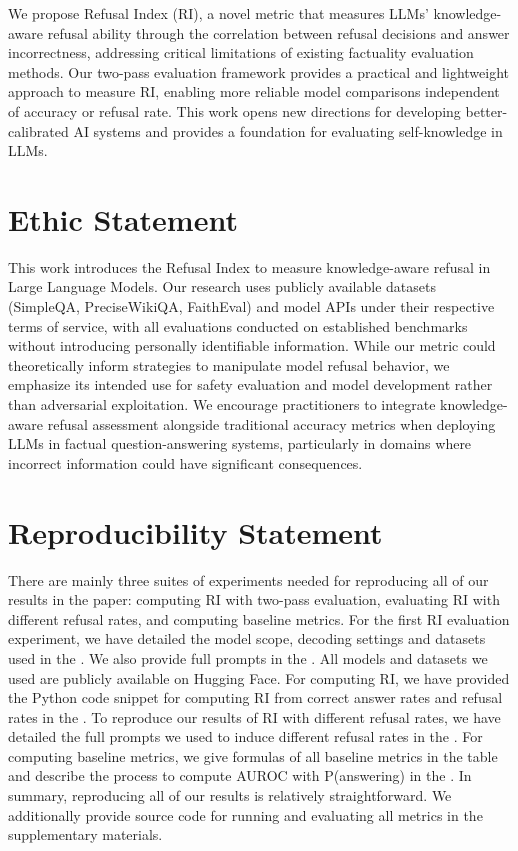 We propose Refusal Index (RI), a novel metric that measures LLMs' knowledge-aware refusal ability through the correlation between refusal decisions and answer incorrectness, addressing critical limitations of existing factuality evaluation methods. 
Our two-pass evaluation framework provides a practical and lightweight approach to measure RI, enabling more reliable model comparisons independent of accuracy or refusal rate. 
This work opens new directions for developing better-calibrated AI systems and provides a foundation for evaluating self-knowledge in LLMs.

\vspace{-0.7em}
\section*{Ethic Statement}
\vspace{-0.7em}

This work introduces the Refusal Index to measure knowledge-aware refusal in Large Language Models. Our research uses publicly available datasets (SimpleQA, PreciseWikiQA, FaithEval) and model APIs under their respective terms of service, with all evaluations conducted on established benchmarks without introducing personally identifiable information. While our metric could theoretically inform strategies to manipulate model refusal behavior, we emphasize its intended use for safety evaluation and model development rather than adversarial exploitation. We encourage practitioners to integrate knowledge-aware refusal assessment alongside traditional accuracy metrics when deploying LLMs in factual question-answering systems, particularly in domains where incorrect information could have significant consequences.

\vspace{-0.7em}
\section*{Reproducibility Statement}
\vspace{-0.7em}

There are mainly three suites of experiments needed for reproducing all of our results in the paper: computing RI with two-pass evaluation, evaluating RI with different refusal rates, and computing baseline metrics.
For the first RI evaluation experiment, we have detailed the model scope, decoding settings and datasets used in the . We also provide full prompts in the . 
All models and datasets we used are publicly available on Hugging Face. 
For computing RI, we have provided the Python code snippet for computing RI from correct answer rates and refusal rates in the .
To reproduce our results of RI with different refusal rates, we have detailed the full prompts we used to induce different refusal rates in the . 
For computing baseline metrics, we give formulas of all baseline metrics in the table and describe the process to compute AUROC with P(answering) in the .
In summary, reproducing all of our results is relatively straightforward. 
We additionally provide source code for running and evaluating all metrics in the supplementary materials.
